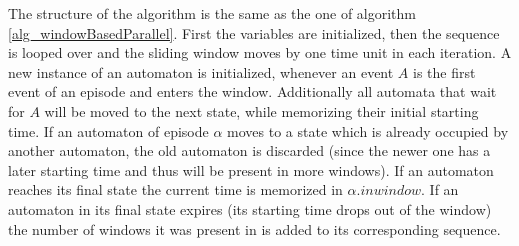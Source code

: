 The structure of the algorithm is the same as the one of algorithm \ref{alg_windowBasedParallel}. First the variables are initialized, then the sequence is looped over and the sliding window moves by one time unit in each iteration. A new instance of an automaton is initialized, whenever an event $A$ is the first event of an episode and enters the window. Additionally all automata that wait for $A$ will be moved to the next state, while memorizing their initial starting time. If an automaton of episode $\alpha$ moves to a state which is already occupied by another automaton, the old automaton is discarded (since the newer one has a later starting time and thus will be present in more windows). If an automaton reaches its final state the current time is memorized in $\alpha .inwindow$. If an automaton in its final state expires (its starting time drops out of the window) the number of windows it was present in is added to its corresponding sequence.


